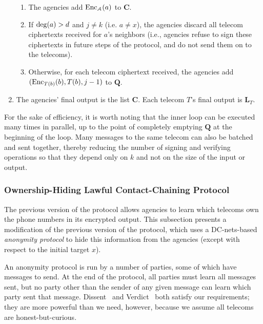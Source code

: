 \begin{enumerate}
\begin{enumerate}
\item \label{proto1:receive} The agencies add $\operatorname{Enc}_\mathcal{A}(a)$ to $\mathbf{C}$.

\item If $\operatorname{deg}(a)>d$ and $j\neq k$ (i.e. $a\neq x$), the agencies discard all telecom ciphertexts received for $a$'s neighbors (i.e., agencies refuse to sign these ciphertexts in future steps of the protocol, and do not send them on to the telecoms).

\item Otherwise, for each telecom ciphertext received, the agencies add $(\operatorname{Enc}_{T(b)}(b), T(b), j-1)$ to $\mathbf{Q}$.

\end{enumerate}

\item The agencies' final output is the list $\mathbf{C}$. Each telecom $T$'s final output is $\mathbf{L}_T$.

\end{enumerate}



For the sake of efficiency, it is worth noting that the inner loop can be executed many times in parallel, up to the point of completely emptying $\mathbf{Q}$ at the beginning of the loop. Many messages to the same telecom can also be batched and sent together, thereby reducing the number of signing and verifying operations so that they depend only on $k$ and not on the size of the input or output.



\subsubsection{Ownership-Hiding Lawful Contact-Chaining Protocol}

\label{sec-proto2}



The previous version of the protocol allows agencies to learn which telecoms own the phone numbers in its encrypted output. This subsection presents a modification of the previous version of the protocol, which uses a DC-nets-based \emph{anonymity protocol} to hide this information from the agencies (except with respect to the initial target $x$).


An anonymity protocol is run by a number of parties, some of which have messages to send. At the end of the protocol, all parties must learn all messages sent, but no party other than the sender of any given message can learn which party sent that message. Dissent~\cite{dissent} and Verdict~\cite{verdict} both satisfy our requirements; they are more powerful than we need, however, because we assume all telecoms are honest-but-curious.


